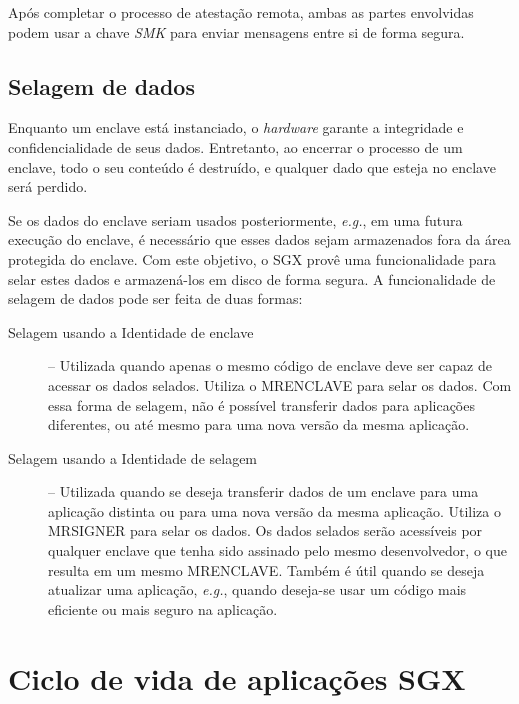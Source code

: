 Após completar o processo de atestação remota, ambas as partes envolvidas podem
usar a chave \textit{SMK} para enviar mensagens entre si de forma segura.

\subsection{Selagem de dados}
\label{subsec:sgx_funcionalidades_selagem_dados}

Enquanto um enclave está instanciado, o \textit{hardware} garante a integridade
e confidencialidade de seus dados. Entretanto, ao encerrar o processo de um
enclave, todo o seu conteúdo é destruído, e qualquer dado que esteja no enclave
será perdido.

Se os dados do enclave seriam usados posteriormente, \textit{e.g.}, em uma
futura execução do enclave, é necessário que esses dados sejam armazenados fora
da área protegida do enclave.
Com este objetivo, o SGX provê uma funcionalidade para selar estes dados e
armazená-los em disco de forma segura.
A funcionalidade de selagem de dados pode ser feita de duas formas:

\begin{description}
    \item [Selagem usando a Identidade de enclave] -- Utilizada quando apenas o
    mesmo código de enclave deve ser capaz de acessar os dados selados. Utiliza
    o MRENCLAVE para selar os dados.
    Com essa forma de selagem, não é possível transferir dados para aplicações
    diferentes, ou até mesmo para uma nova versão da mesma aplicação.

    \item [Selagem usando a Identidade de selagem] -- Utilizada quando se deseja
    transferir dados de um enclave para uma aplicação distinta ou para uma nova
    versão da mesma aplicação. Utiliza o MRSIGNER para selar os dados.
    Os dados selados serão acessíveis por qualquer enclave que tenha sido
    assinado pelo mesmo desenvolvedor, o que resulta em um mesmo MRENCLAVE.
    Também é útil quando se deseja atualizar uma aplicação, \textit{e.g.},
    quando deseja-se usar um código mais eficiente ou mais seguro na aplicação.
\end{description}

\section{Ciclo de vida de aplicações SGX}
\label{sec:sgx_ciclo_vida}

